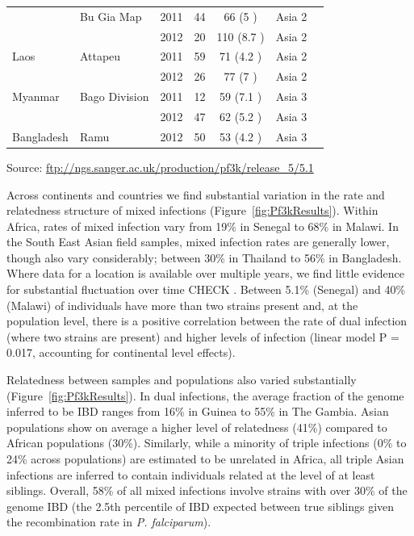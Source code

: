 \documentclass[9pt,lineno]{elife}
\begin{document}
\begin{table}[bt]
\begin{tabular}{l l c c c c c}
                &Bu Gia Map     &2011 &44   &66   (5   )&Asia 2  \\
                &               &2012 &20   &110  (8.7 )&Asia 2  \\
 \hline
Laos            &Attapeu        &2011 &59   &71   (4.2 )&Asia 2  \\
                &               &2012 &26   &77   (7   )&Asia 2  \\
 \hline
Myanmar         &Bago Division  &2011 &12   &59   (7.1 )&Asia 3  \\
                &               &2012 &47   &62   (5.2 )&Asia 3  \\
 \hline
Bangladesh      &Ramu           &2012 &50   &53   (4.2 )&Asia 3  \\
\bottomrule
\end{tabular}

\medskip
Source: \url{ftp://ngs.sanger.ac.uk/production/pf3k/release_5/5.1}

\end{table}

Across continents and countries we find substantial variation in the rate and relatedness structure of mixed infections (Figure~\ref{fig:Pf3kResults}).  Within Africa, rates of mixed infection vary from 19\% in Senegal to 68\% in Malawi.  In the South East Asian field samples, mixed infection rates are generally lower, though also vary considerably; between 30\% in Thailand to 56\% in Bangladesh.  Where data for a location is available over multiple years, we find little evidence for substantial fluctuation over time CHECK .  Between 5.1\% (Senegal) and 40\% (Malawi) of individuals have more than two strains present and, at the population level, there is a positive correlation between the rate of dual infection (where two strains are present) and higher levels of infection (linear model P = 0.017, accounting for continental level effects).

Relatedness between samples and populations also varied substantially (Figure~\ref{fig:Pf3kResults}).  In dual infections, the average fraction of the genome inferred to be IBD ranges from 16\% in Guinea to 55\% in The Gambia.   Asian populations show on average a higher level of relatedness (41\%) compared to African populations (30\%).  Similarly, while a minority of triple infections (0\% to 24\% across populations) are estimated to be unrelated in Africa, all triple Asian infections are inferred to contain individuals related at the level of at least siblings.  Overall, 58\% of all mixed infections involve strains with over 30\% of the genome IBD (the 2.5th percentile of IBD expected between true siblings given the recombination rate in {\it P. falciparum}).
\end{document}
